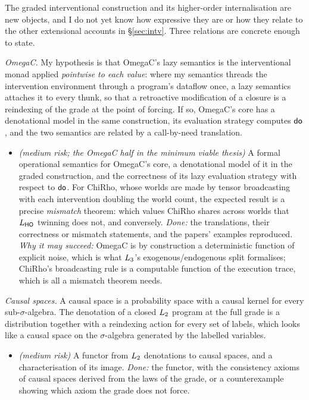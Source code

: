 The graded interventional construction and its higher-order internalisation are new objects, and I do not yet know how expressive they are or how they relate to the other extensional accounts in \S\ref{sec:intv}. Three relations are concrete enough to state.

\emph{OmegaC.} My hypothesis is that OmegaC's lazy semantics is the interventional monad applied \emph{pointwise to each value}: where my semantics threads the intervention environment through a program's dataflow once, a lazy semantics attaches it to every thunk, so that a retroactive modification of a closure is a reindexing of the grade at the point of forcing. If so, OmegaC's core has a denotational model in the same construction, its evaluation strategy computes $\mathsf{do}$, and the two semantics are related by a call-by-need translation.
\begin{itemize}[nosep]
\item[B1] \textit{(medium risk; the OmegaC half in the minimum viable thesis)} A formal operational semantics for OmegaC's core, a denotational model of it in the graded construction, and the correctness of its lazy evaluation strategy with respect to $\mathsf{do}$. For ChiRho, whose worlds are made by tensor broadcasting with each intervention doubling the world count, the expected result is a precise \emph{mismatch} theorem: which values ChiRho shares across worlds that $L_{\mathsf{HO}}$ twinning does not, and conversely. \emph{Done:} the translations, their correctness or mismatch statements, and the papers' examples reproduced. \emph{Why it may succeed:} OmegaC is by construction a deterministic function of explicit noise, which is what $L_{3}$'s exogenous/endogenous split formalises; ChiRho's broadcasting rule is a computable function of the execution trace, which is all a mismatch theorem needs.
\end{itemize}
\emph{Causal spaces.} A causal space is a probability space with a causal kernel for every sub-$\sigma$-algebra. The denotation of a closed $L_{2}$ program at the full grade is a distribution together with a reindexing action for every set of labels, which looks like a causal space on the $\sigma$-algebra generated by the labelled variables.
\begin{itemize}[nosep]
\item[B2] \textit{(medium risk)} A functor from $L_{2}$ denotations to causal spaces, and a characterisation of its image. \emph{Done:} the functor, with the consistency axioms of causal spaces derived from the laws of the grade, or a counterexample showing which axiom the grade does not force.
\end{itemize}
